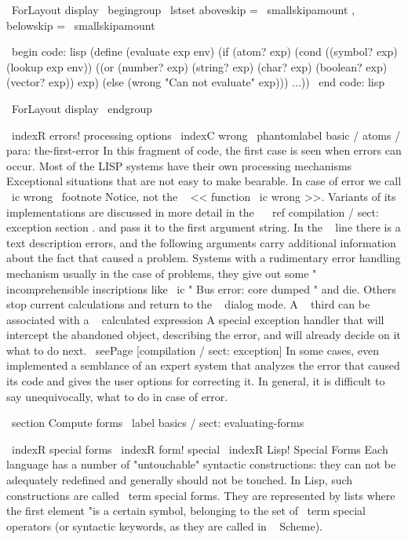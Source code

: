 \ ForLayout {display} { \ begingroup
\ lstset {aboveskip = \ smallskipamount , belowskip = \ smallskipamount }}

\ begin {code: lisp}
(define (evaluate exp env)
  (if (atom? exp)
      (cond ((symbol? exp) (lookup exp env))
            ((or (number? exp) (string? exp) (char? exp)
                 (boolean? exp) (vector? exp))
             exp)
            (else (wrong "Can not evaluate" exp)))
      ...))
\ end {code: lisp}

\ ForLayout {display} { \ endgroup }

\ indexR {errors! processing options}
\ indexC {wrong}
\ phantomlabel {basic / atoms / para: the-first-error}
In this fragment of code, the first case is seen when errors can occur.
Most of the LISP systems have their own processing mechanisms
Exceptional situations that are not easy to make bearable. In case of error
we call \ ic {wrong} \ footnote {Notice, not the ~ << function \ ic {wrong} >>. Variants of its
implementations are discussed in more detail in the ~ \ ref {compilation / sect: exception} section .}
and pass it to the first argument string. In the ~ line there is a text description
errors, and the following arguments carry additional information about the fact that
caused a problem. Systems with a rudimentary error handling mechanism usually
in the case of problems, they give out some "~ incomprehensible inscriptions like \ ic {" Bus error: core
dumped "} and die. Others stop current calculations and return
to the ~ dialog mode. A ~ third can be associated with a ~ calculated expression
A special exception handler that will intercept the abandoned object,
describing the error, and will already decide on it what to do next.
\ seePage [compilation / sect: exception] In some cases, even implemented
a semblance of an expert system that analyzes the error that caused its code and
gives the user options for correcting it. In general, it is difficult to say unequivocally,
what to do in case of error.


\ section {Compute forms} \ label {basics / sect: evaluating-forms}

\ indexR {special forms}
\ indexR {form! special}
\ indexR {Lisp! Special Forms}
Each language has a number of "untouchable" syntactic
constructions: they can not be adequately redefined and generally should not be touched.
In Lisp, such constructions are called \ term {special forms}. They
are represented by lists where the first element "is a certain symbol,
belonging to the set of \ term {special operators} (or syntactic
keywords, as they are called in ~ Scheme).

